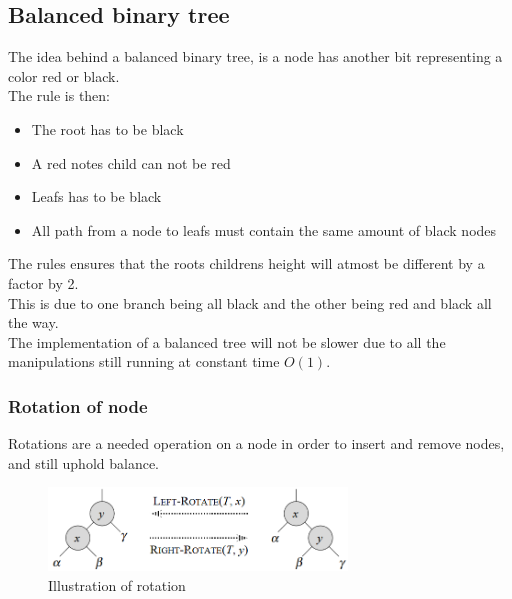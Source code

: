 \documentclass[12pt, a4paper]{article}
\begin{document}
					
			\subsection{Balanced binary tree}
				The idea behind a balanced binary tree, is a node has another bit representing a color red or black.\\
				The rule is then:
				\begin{itemize}
					\item The root has to be black
					\item A red notes child can not be red
					\item Leafs has to be black
					\item All path from a node to leafs must contain the same amount of black nodes
				\end{itemize}
				The rules ensures that the roots childrens height will atmost be different by a factor by 2.\\
				This is due to one branch being all black and the other being red and black all the way.\\
				The implementation of a balanced tree will not be slower due to all the manipulations still running at constant time $O(1)$.
				\subsubsection{Rotation of node}
					Rotations are a needed operation on a node in order to insert and remove nodes, and still uphold balance.\\
					\begin{figure}[h!]
						\center
						\includegraphics[width=300px]{assets/rotation.png}
						\caption{Illustration of rotation}
					\end{figure}
					
\end{document}
